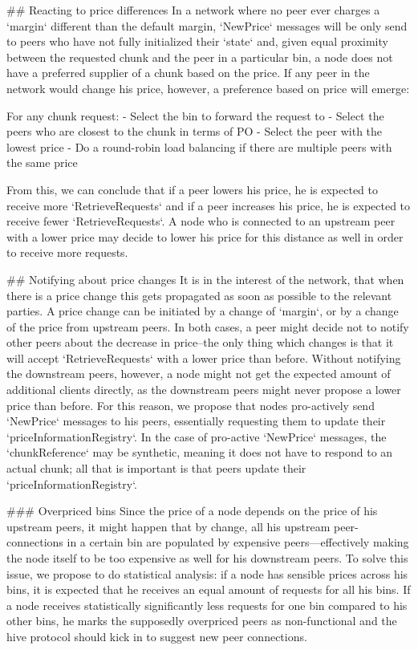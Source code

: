 ## Reacting to price differences
In a network where no peer ever charges a `margin` different than the default margin, `NewPrice` messages will be only send to peers who have not fully initialized their `state` and, given equal proximity between the requested chunk and the peer in a particular bin, a node does not have a preferred supplier of a chunk based on the price. If any peer in the network would change his price, however, a preference based on price will emerge:

For any chunk request:
- Select the bin to forward the request to
- Select the peers who are closest to the chunk in terms of PO
- Select the peer with the lowest price
- Do a round-robin load balancing if there are multiple peers with the same price

From this, we can conclude that if a peer lowers his price, he is expected to receive more `RetrieveRequests` and if a peer increases his price, he is expected to receive fewer `RetrieveRequests`. A node who is connected to an upstream peer with a lower price may decide to lower his price for this distance as well in order to receive more requests.

## Notifying about price changes
It is in the interest of the network, that when there is a price change this gets propagated as soon as possible to the relevant parties. A price change can be initiated by a change of `margin`, or by a change of the price from upstream peers. In both cases, a peer might decide not to notify other peers about the decrease in price--the only thing which changes is that it will accept `RetrieveRequests` with a lower price than before. Without notifying the downstream peers, however, a node might not get the expected amount of additional clients directly, as the downstream peers might never propose a lower price than before. For this reason, we propose that nodes pro-actively send `NewPrice` messages to his peers, essentially requesting them to update their `priceInformationRegistry`. In the case of pro-active `NewPrice` messages, the `chunkReference` may be synthetic, meaning it does not have to respond to an actual chunk; all that is important is that peers update their `priceInformationRegistry`.

### Overpriced bins
Since the price of a node depends on the price of his upstream peers, it might happen that by change, all his upstream peer-connections in a certain bin are populated by expensive peers—effectively making the node itself to be too expensive as well for his downstream peers. To solve this issue, we propose to do statistical analysis: if a node has sensible prices across his bins, it is expected that he receives an equal amount of requests for all his bins. If a node receives statistically significantly less requests for one bin compared to his other bins, he marks the supposedly overpriced peers as non-functional and the hive protocol should kick in to suggest new peer connections. 

